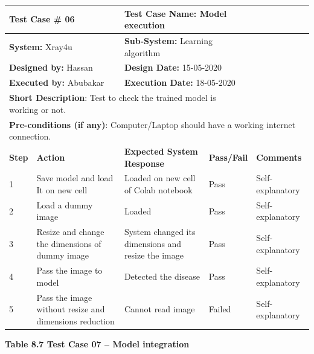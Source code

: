 \documentclass{article} %
\begin{document}
\begin{tabular}{|p{0.4in}|p{1.3in}|p{1.4in}|p{0.5in}|p{0.7in}|} \hline 
\multicolumn{2}{|p{1in}|}{\textbf{Test Case \#} 06} & \multicolumn{2}{|p{2.0in}|}{\textbf{Test Case Name:} Model execution} &  \\ \hline 
\multicolumn{2}{|p{1in}|}{\textbf{System:} Xray4u} & \multicolumn{2}{|p{2.0in}|}{\textbf{Sub-System: }Learning algorithm} &  \\ \hline 
\multicolumn{2}{|p{1in}|}{\textbf{Designed by:} Hassan} & \multicolumn{2}{|p{2.0in}|}{\textbf{Design Date:} 15-05-2020} &  \\ \hline 
\multicolumn{2}{|p{1in}|}{\textbf{Executed by: }Abubakar} & \multicolumn{2}{|p{2.0in}|}{\textbf{Execution Date:} 18-05-2020} &  \\ \hline 
\multicolumn{4}{|p{1in}|}{\textbf{Short Description}: Test to check the trained model is working or not.} &  \\ \hline 
\multicolumn{5}{|p{1in}|}{\textbf{Pre-conditions (if any)}: Computer/Laptop should have a working internet connection. } \\ \hline 
\textbf{Step} & \textbf{Action} & \textbf{Expected System Response} & \textbf{Pass/Fail} & \textbf{Comments} \\ \hline 
1 & Save model and load It on new cell & Loaded on new cell of Colab notebook & Pass & Self-explanatory \\ \hline 
2 & Load a dummy image  & Loaded & Pass & Self-explanatory \\ \hline 
3 & Resize and change the dimensions of dummy image & System changed its dimensions and resize the image  & Pass & Self-explanatory \\ \hline 
4 & Pass the image to model  & Detected the disease & Pass & Self-explanatory \\ \hline 
5 & Pass the image without resize and dimensions reduction & Cannot read image & Failed & Self-explanatory \\ \hline 
\end{tabular}

\eject 

\noindent \textbf{Table 8.7 Test Case 07 -- Model integration}
\end{document}
